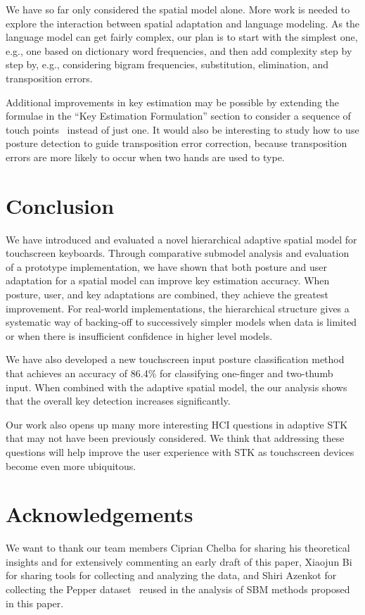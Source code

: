 \documentclass{sigchi}
\begin{document}
We have so far only considered the spatial model alone. More work is needed
to explore the interaction between spatial adaptation and language modeling.
As the language model can get fairly complex, our plan is to start with the
simplest one, e.g., one based on dictionary word frequencies, and then add
complexity step by step by, e.g., considering bigram frequencies, substitution,
elimination, and transposition errors.

Additional improvements in key estimation may be possible by extending the formulae in the ``Key Estimation Formulation'' section to consider a
sequence of touch points~\cite{Goodman:2002, Gunawardana:2010} instead of just one.
It would also be interesting to study how to use posture detection to guide 
transposition error correction, because transposition errors are more likely to 
occur when two hands are used to type.

\section{Conclusion}
We have introduced and evaluated a novel hierarchical adaptive spatial model for
touchscreen keyboards. Through comparative submodel analysis and evaluation of a prototype implementation, we have shown that both posture and user adaptation for a spatial model can improve key estimation accuracy. When posture, user, and key adaptations are combined, they 
achieve the greatest improvement. For real-world
implementations, the
hierarchical structure gives a systematic way of backing-off to successively simpler models  when data is limited
or when there is insufficient confidence in higher level models.

We have also developed a new touchscreen input posture classification method
that achieves an accuracy of 86.4\% for classifying one-finger and two-thumb input. When
combined with the adaptive spatial model, the our analysis shows that the overall key detection increases significantly.

Our work also opens up many more interesting HCI questions in adaptive STK
that may not have been previously considered. We think that addressing these questions
will help improve the user experience with STK as touchscreen
devices become even more ubiquitous.

\section{Acknowledgements}
We want to thank our team members
Ciprian Chelba for sharing his theoretical insights and for extensively 
commenting an early draft of this paper, Xiaojun Bi for sharing tools for
collecting and analyzing the data, and Shiri Azenkot for collecting the Pepper
dataset~\cite{Azenkot:2012} reused in the analysis of SBM methods proposed in this paper.

\small


\end{document}

